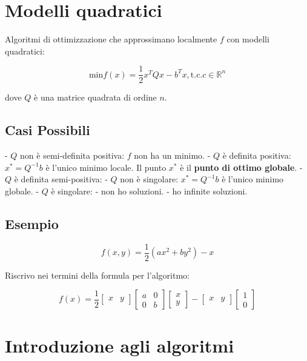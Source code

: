 \documentclass[\main/main.tex]{subfiles}
\begin{document}
\section{Modelli quadratici}

Algoritmi di ottimizzazione che approssimano localmente $f$ con modelli quadratici:

\[
	\text{min} f(x) = \dfrac{1}{2}x^T Qx - b^Tx, \text{t.c.} c \in \mathbb{R}^n
\]

dove $Q$ è una matrice quadrata di ordine $n$.

\subsection{Casi Possibili}

- $Q$ non è semi-definita positiva: $f$ non ha un minimo.
- $Q$ è definita positiva: $x^* = Q^{-1}b$ è l'unico minimo locale. Il punto $x^*$ è il \textbf{punto di ottimo globale}.
- $Q$ è definita semi-positiva:
	- $Q$ non è singolare: $x^* = Q^{-1} b$ è l'unico minimo globale. 
	- $Q$ è singolare:
		- non ho soluzioni.
		- ho infinite soluzioni.


\subsection{Esempio}

\[
	f(x,y) = \dfrac{1}{2} (ax^2 + by^2) - x
\]

Riscrivo nei termini della formula per l'algoritmo:

\[
	f(x) = \dfrac{1}{2}
	\begin{bmatrix}
    	x & y 
	\end{bmatrix}
	\begin{bmatrix}
    	a & 0 \\
    	0 & b 
	\end{bmatrix}
	\begin{bmatrix}
    	x\\
    	y 
	\end{bmatrix}
	- 
	\begin{bmatrix}
    	x & y 
	\end{bmatrix}
	\begin{bmatrix}
    	1\\
    	0 
	\end{bmatrix}
\]


\section{Introduzione agli algoritmi}
\end{document}
